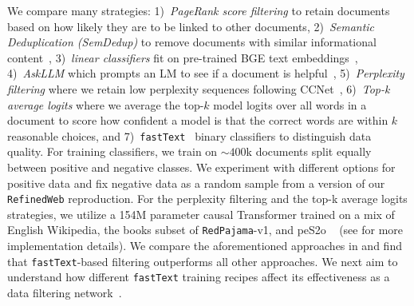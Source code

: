 \documentclass{article}
\newcommand{\rpj}{\texttt{RedPajama}\xspace}
\newcommand{\rw}{\texttt{RefinedWeb}\xspace}
\newcommand{\fasttext}{\texttt{fastText}\xspace}
\newcommand{\askllm}{AskLLM\xspace}
\begin{document}
We compare many strategies:
1)~\emph{PageRank score filtering} to retain documents based on how likely they are to be linked to other documents,
2)~\emph{Semantic Deduplication (SemDedup)} to remove documents with similar informational content~\citep{abbas2023semdedup},
3)~\emph{linear classifiers} fit on pre-trained BGE text embeddings~\citep{bge_embedding},
4)~\emph{\askllm} which prompts an LM to see if a document is helpful~\citep{sachdeva2024train},
5)~\emph{Perplexity filtering} where we retain low perplexity sequences following CCNet~\citep{wenzek-etal-2020-ccnet},
6)~\emph{Top-k average logits} where we average the top-$k$ model logits over all words in a document to score how confident a model is that the correct words are within $k$ reasonable choices,
and
7)~\fasttext~\citep{joulin2017bag} binary classifiers to distinguish data quality.
For training classifiers, we train on $\sim 400$k documents split equally between positive and negative classes.
We experiment with different options for positive data and fix negative data as a random sample from a version of our \rw reproduction.
For the perplexity filtering and the top-k average logits strategies, we utilize a 154M parameter causal Transformer trained on a mix of English Wikipedia, the books subset of \rpj-v1, and peS2o ~\citep{peS2o, rpj} (see  for more implementation details).
We compare the aforementioned approaches in  and find that \fasttext-based filtering outperforms all other approaches.
We next aim to understand how different \fasttext training recipes affect its effectiveness as a data filtering network~\citep{fang2023dfn}.
\end{document}
